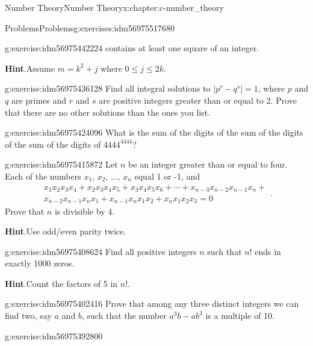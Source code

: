 \documentclass[twoside,10pt,]{book}
\newcommand{\blocktitlefont}{\relax}
\numberwithin{equation}{section}
\begin{document}
\begin{chapterptx}{Number Theory}{}{Number Theory}{}{}{x:chapter:c-number_theory}
\begin{exercises-section}{Problems}{}{Problems}{}{}{g:exercises:idm56975517680}
\begin{divisionexercise}{8}{}{}{g:exercise:idm56975442224}
contains at least one square of an integer.%
\par\smallskip%
\noindent\textbf{\blocktitlefont Hint}.\hypertarget{g:hint:idm56975439840}{}\quad{}Assume \(m = k^2 + j\) where \(0 \leq j \leq 2k\).%
\end{divisionexercise}%
\begin{divisionexercise}{9}{}{}{g:exercise:idm56975436128}%
Find all integral solutions to \(\left|p^r-q^s\right|=1\), where \(p\) and \(q\) are primes and \(r\) and \(s\) are positive integers greater than or equal to 2. Prove that there are no other solutions than the ones you list.%
\end{divisionexercise}%
\begin{divisionexercise}{10}{}{}{g:exercise:idm56975424096}%
What is the sum of the digits of the sum of the digits of the sum of the digits of \(4444^{4444}\)?%
\end{divisionexercise}%
\begin{divisionexercise}{11}{}{}{g:exercise:idm56975415872}%
Let \(n\) be an integer greater than or equal to four.  Each of the numbers \(x_1\), \(x_2\), ..., \(x_n\) equal 1 or -1, and%
\begin{equation*}
\begin{split}
x_1x_2x_3x_4+x_2x_3x_4x_5+x_3x_4x_5x_6+\cdots+x_{n-3}x_{n-2}x_{n-1}x_n+\\
x_{n-2}x_{n-1}x_nx_1+x_{n-1}x_nx_1x_2+x_nx_1x_2x_3=0
\end{split}\text{.}
\end{equation*}
Prove that \(n\) is divisible by 4.%
\par\smallskip%
\noindent\textbf{\blocktitlefont Hint}.\hypertarget{g:hint:idm56975412160}{}\quad{}Use odd\slash{}even parity twice.%
\end{divisionexercise}%
\begin{divisionexercise}{12}{}{}{g:exercise:idm56975408624}%
Find all positive integers \(n\) such that \(n!\) ends in exactly 1000 zeros.%
\par\smallskip%
\noindent\textbf{\blocktitlefont Hint}.\hypertarget{g:hint:idm56975403472}{}\quad{}Count the factors of 5 in \(n!\).%
\end{divisionexercise}%
\begin{divisionexercise}{13}{}{}{g:exercise:idm56975402416}%
Prove that among any three distinct integers we can find two, say \(a\) and \(b\), such that the number \(a^3b - a b^3\) is a multiple of 10.%
\end{divisionexercise}%
\begin{divisionexercise}{14}{}{}{g:exercise:idm56975392800}%

\end{divisionexercise}
\end{exercises-section}
\end{chapterptx}
\end{document}
